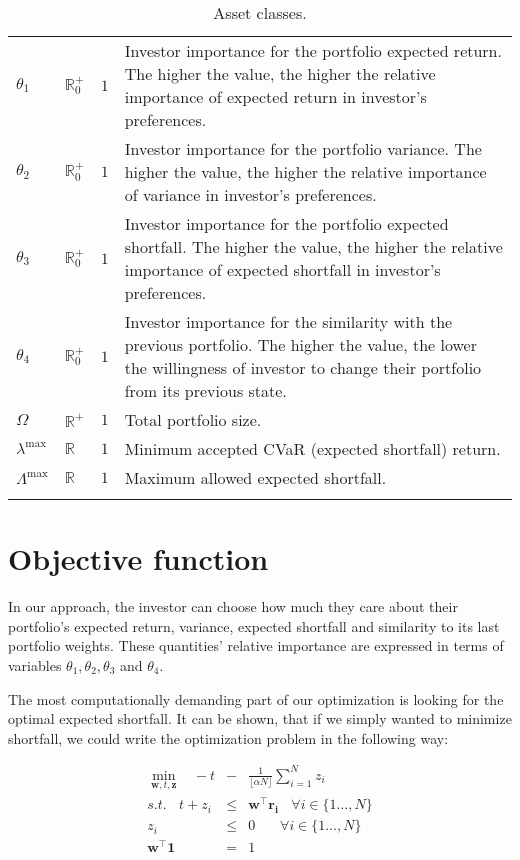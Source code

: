 \begin{table}[h]
\begin{tabularx}{0.9\linewidth}{lllX}
		\textbf{$\theta_1$} & $\mathbb{R}_0^+$	& $1$ &  Investor importance for the portfolio  expected return. The higher the value, the higher the relative importance of expected return in investor's preferences.\\
		\textbf{$\theta_2$} & $\mathbb{R}_0^+$	& $1$ &  Investor importance for the portfolio variance. The higher the value, the higher the relative importance of variance in investor's preferences.\\
		\textbf{$\theta_3$} & $\mathbb{R}_0^+$	& $1$ &  Investor importance for the portfolio expected shortfall. The higher the value, the higher the relative importance of expected shortfall in investor's preferences.\\
		\textbf{$\theta_4$} & $\mathbb{R}_0^+$	& $1$ &  Investor importance for the similarity with the previous portfolio. The higher the value, the lower the willingness of investor to change their portfolio from its previous state.\\
		\textbf{$\Omega$} & $\mathbb{R}^+$	& $1$ &  Total portfolio size.\\
		\textbf{$\lambda^{\max}$} & $\mathbb{R}$	& $1$ &  Minimum accepted CVaR (expected shortfall) return.\\	
		\textbf{$\Lambda^{\max}$} & $\mathbb{R}$	& $1$ &  Maximum allowed expected shortfall.\\		
		
		\bottomrule& & 
	\end{tabularx}
	\caption{Asset classes.}
	\label{tab:portfolio_optimization:variables}
\end{table}

\section{Objective function}

In our approach, the investor can choose how much they care about their portfolio's expected return, variance, expected shortfall and similarity to its last portfolio weights. These quantities' relative importance are expressed in terms of variables $\theta_1, \theta_2, \theta_3$ and $\theta_4$.

The most computationally demanding part of our optimization is looking for the optimal expected shortfall. It can be shown, that if we simply wanted to minimize shortfall, we could write the optimization problem in the following way:


\begin{eqnarray}
	\min_{\mathbf{w},t,\mathbf{z}} \ \ \ \ - t &-& \frac{1}{\lfloor{\alpha N}\rfloor} \sum_{i=1}^{N} z_i \label{eq:shortfall_optimization}\\
	s.t. \ \ \ \ t + z_i &\leq& \mathbf{w}^\top \mathbf{r_i}\ \ \ \ \forall i\in \{1\ldots,N\}\\
					z_i&\leq& 0 \ \ \ \ \ \ \ \ \forall i\in \{1\ldots,N\}\\
						\mathbf{w}^\top \textbf{1}&=&1
\end{eqnarray}

